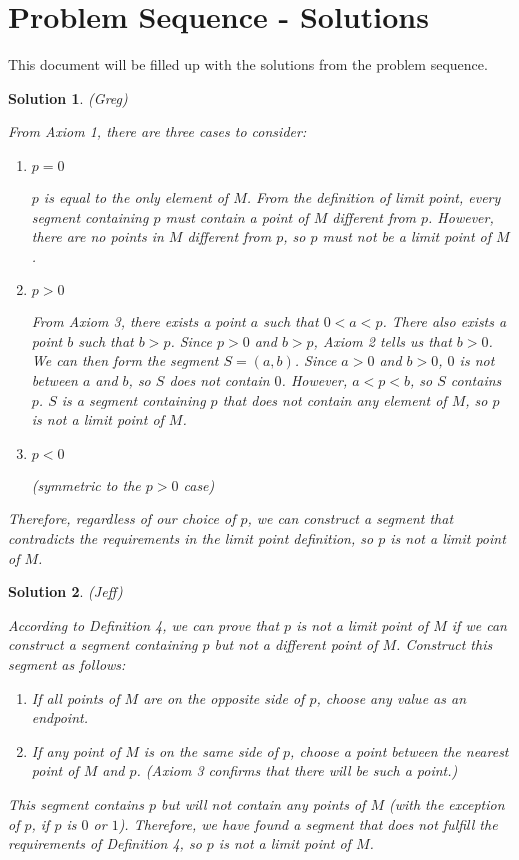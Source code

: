 \documentclass{article}
\newtheorem{solution}{Solution}
\begin{document}
\section*{Problem Sequence - Solutions}
This document will be filled up with the solutions from the problem sequence.

\begin{solution} 
(Greg)

From Axiom 1, there are three cases to consider:
\begin{enumerate}
\item
$p = 0$

$p$ is equal to the only element of $M$. 
From the definition of limit point, every segment containing $p$ must contain a point of $M$ different from $p$. 
However, there are no points in $M$ different from $p$, so $p$ must not be a limit point of $M$.

\item
$p > 0$

From Axiom 3, there exists a point $a$ such that $0 < a < p$. 
There also exists a point $b$ such that $b > p$. 
Since $p > 0$ and $b > p$, Axiom 2 tells us that $b > 0$. 
We can then form the segment $S = (a, b)$. 
Since $a > 0$ and $b > 0$, $0$ is not between $a$ and $b$, so $S$ does not contain $0$. 
However, $a < p < b$, so $S$ contains $p$. 
$S$ is a segment containing $p$ that does not contain any element of $M$, so $p$ is not a limit point of $M$.

\item
$p < 0$

(symmetric to the $p > 0$ case)
\end{enumerate}

Therefore, regardless of our choice of $p$, we can construct a segment that contradicts the requirements in the limit point definition, so $p$ is not a limit point of $M$.
\end{solution}

\begin{solution} %
(Jeff)

According to Definition 4, we can prove that $p$ is not a limit point of $M$ if we can construct a segment containing $p$ but not a different point of $M$.
Construct this segment as follows:

\begin{enumerate}
\item
If all points of $M$ are on the opposite side of $p$, choose any value as an endpoint.

\item
If any point of $M$ is on the same side of $p$, choose a point between the nearest point of $M$ and $p$.
(Axiom 3 confirms that there will be such a point.)
\end{enumerate}

This segment contains $p$ but will not contain any points of $M$ (with the exception of $p$, if $p$ is $0$ or $1$).
Therefore, we have found a segment that does not fulfill the requirements of Definition 4, so $p$ is not a limit point of $M$.
\end{solution}
\end{document}
